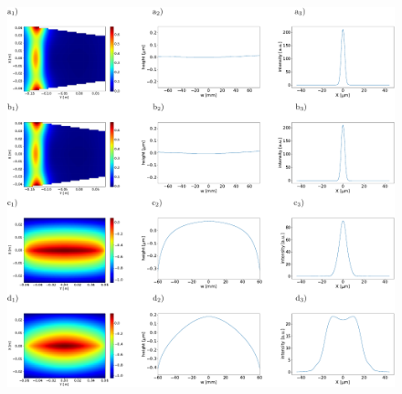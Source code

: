\documentclass{iucr}
\begin{document}
  \begin{figure}
  \label{fig:M1deformation} 
%
%   
%
%   
%   
   \includegraphics[width=1.0\textwidth]{figures/fig2.pdf}

\end{figure}
\end{document}
